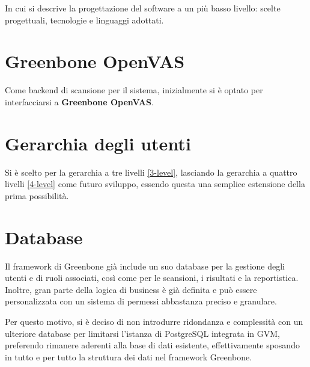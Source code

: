 In cui si descrive la progettazione del software a un più basso livello: scelte progettuali, tecnologie e linguaggi adottati.

\section{Greenbone OpenVAS}
Come backend di scansione per il sistema, inizialmente si è optato per interfacciarsi a \textbf{Greenbone OpenVAS}.

\section{Gerarchia degli utenti}
Si è scelto per la gerarchia a tre livelli \ref{3-level}, lasciando la gerarchia a quattro livelli \ref{4-level} come futuro sviluppo, essendo questa una semplice estensione della prima possibilità.

\section{Database}
Il framework di Greenbone già include un suo database per la gestione degli utenti e di ruoli associati, così come per le scansioni, i risultati e la reportistica. Inoltre, gran parte della logica di business è già definita e può essere personalizzata con un sistema di permessi abbastanza preciso e granulare.

Per questo motivo, si è deciso di non introdurre ridondanza e complessità con un ulteriore database per limitarsi l'istanza di PostgreSQL integrata in GVM, preferendo rimanere aderenti alla base di dati esistente, effettivamente sposando in tutto e per tutto la struttura dei dati nel framework Greenbone.

